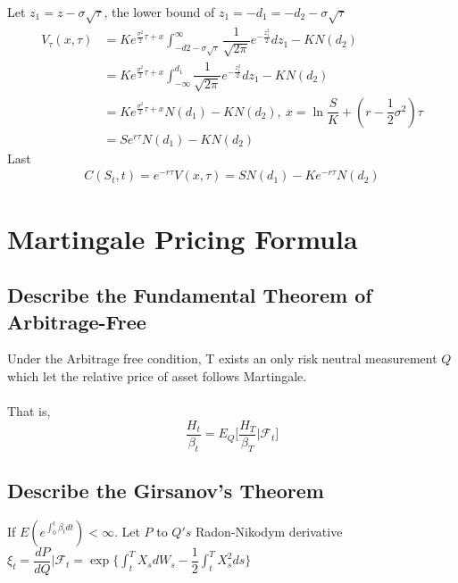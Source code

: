 \documentclass[12pt]{article}
\begin{document}
Let $z_1 = z - \sigma\sqrt{\tau}$, the lower bound of $z_1 = -d_1 = -d_2 - \sigma\sqrt{\tau}$
\begin{align*}
    V_{\tau}(x,\tau) & = Ke^{\frac{\sigma^2}{2}\tau+x}\int_{-d2-\sigma\sqrt{\tau}}^{\infty} \dfrac{1}{\sqrt{2\pi}}e^{-\frac{z_1^2}{2}} dz_1 - KN(d_2)\\
    & = Ke^{\frac{\sigma^2}{2}\tau+x}\int_{-\infty}^{d_1} \dfrac{1}{\sqrt{2\pi}}e^{-\frac{z_1^2}{2}} dz_1 - KN(d_2)\\
    & = Ke^{\frac{\sigma^2}{2}\tau+x}N(d_1) - KN(d_2),\ x = \ln\dfrac{S}{K} + (r-\dfrac{1}{2}\sigma^2)\tau\\
    & = Se^{r\tau}N(d_1) - KN(d_2)
\end{align*}
Last
\begin{align*}
    C(S_t, t) = e^{-r\tau}V(x,\tau) = SN(d_1) - Ke^{-r\tau}N(d_2)
\end{align*}
\section{Martingale Pricing Formula}
\subsection*{Describe the Fundamental Theorem of Arbitrage-Free}
Under the Arbitrage free condition, T exists an only risk neutral measurement $Q$ which let the relative price of asset follows Martingale.\\\\
That is,\\
\[\dfrac{H_t}{\beta_t} = E_Q\Bigg[\dfrac{H_T}{\beta_T}\Bigg|\mathcal{F}_t\Bigg]\]
\subsection*{Describe the Girsanov's Theorem}
If $E(e^{\int_0^t \beta_t dt})<\infty$. Let $P$ to $Q's$ Radon-Nikodym derivative $\xi_t = \dfrac{dP}{dQ}|\mathcal{F}_t = \exp\{\int_t^T X_s dW_s - \dfrac{1}{2}\int_t^T X_s^2 ds\}$ 
\end{document}
